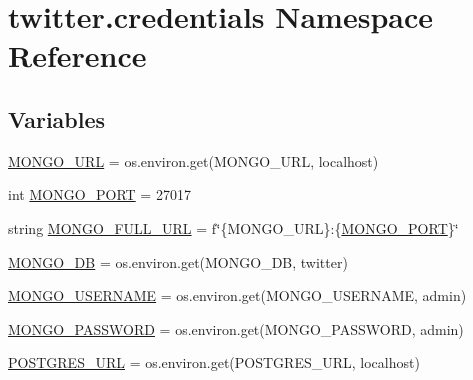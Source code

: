 \hypertarget{namespacetwitter_1_1credentials}{}\section{twitter.\+credentials Namespace Reference}
\label{namespacetwitter_1_1credentials}
\subsection*{Variables}
\begin{DoxyCompactItemize}
\item 
\hyperlink{namespacetwitter_1_1credentials_aa2ca74cd42f35003a7b636283d79b6dc}{M\+O\+N\+G\+O\+\_\+\+U\+RL} = os.\+environ.\+get(\textquotesingle{}M\+O\+N\+G\+O\+\_\+\+U\+RL\textquotesingle{}, \textquotesingle{}localhost\textquotesingle{})
\item 
int \hyperlink{namespacetwitter_1_1credentials_a4efea899b169dfad597b25e9917959d2}{M\+O\+N\+G\+O\+\_\+\+P\+O\+RT} = 27017
\item 
string \hyperlink{namespacetwitter_1_1credentials_a149e7f08ad898976e18c3eae1044a6d9}{M\+O\+N\+G\+O\+\_\+\+F\+U\+L\+L\+\_\+\+U\+RL} = f\char`\"{}\{M\+O\+N\+G\+O\+\_\+\+U\+RL\}\+:\{\hyperlink{namespacetwitter_1_1credentials_a4efea899b169dfad597b25e9917959d2}{M\+O\+N\+G\+O\+\_\+\+P\+O\+RT}\}\char`\"{}
\item 
\hyperlink{namespacetwitter_1_1credentials_aa58ca4b2a93fe3173d37f6d20a382d1c}{M\+O\+N\+G\+O\+\_\+\+DB} = os.\+environ.\+get(\textquotesingle{}M\+O\+N\+G\+O\+\_\+\+DB\textquotesingle{}, \textquotesingle{}twitter\textquotesingle{})
\item 
\hyperlink{namespacetwitter_1_1credentials_aec8c3d659d222f8fbda6c1a6f496e516}{M\+O\+N\+G\+O\+\_\+\+U\+S\+E\+R\+N\+A\+ME} = os.\+environ.\+get(\textquotesingle{}M\+O\+N\+G\+O\+\_\+\+U\+S\+E\+R\+N\+A\+ME\textquotesingle{}, \textquotesingle{}admin\textquotesingle{})
\item 
\hyperlink{namespacetwitter_1_1credentials_a6f6dc35947705ed8eb787b61ea0a7e04}{M\+O\+N\+G\+O\+\_\+\+P\+A\+S\+S\+W\+O\+RD} = os.\+environ.\+get(\textquotesingle{}M\+O\+N\+G\+O\+\_\+\+P\+A\+S\+S\+W\+O\+RD\textquotesingle{}, \textquotesingle{}admin\textquotesingle{})
\item 
\hyperlink{namespacetwitter_1_1credentials_a0a8c1eeefd9d168954b709da1579d62e}{P\+O\+S\+T\+G\+R\+E\+S\+\_\+\+U\+RL} = os.\+environ.\+get(\textquotesingle{}P\+O\+S\+T\+G\+R\+E\+S\+\_\+\+U\+RL\textquotesingle{}, \textquotesingle{}localhost\textquotesingle{})

\end{DoxyCompactItemize}
